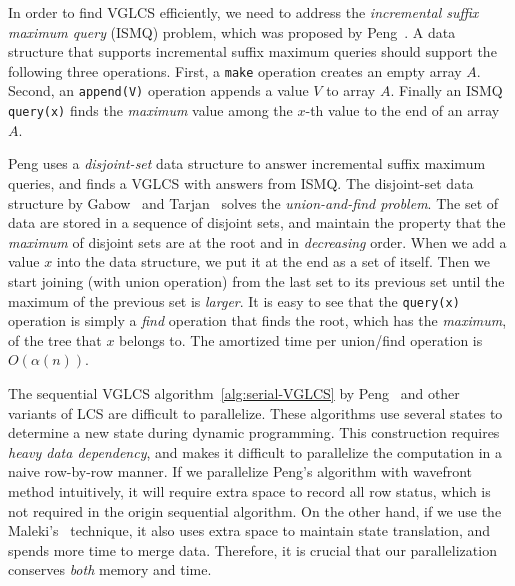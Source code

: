 In order to find VGLCS efficiently, we need to address the {\em
incremental suffix maximum query} (ISMQ) problem, which was proposed by
Peng~\cite{Peng2011TheLC}.  A data structure that supports incremental
suffix maximum queries should support the following three operations.
First, a {\tt make} operation creates an empty array $A$. Second, an
{\tt append(V)} operation appends a value $V$ to array $A$. Finally an
ISMQ {\tt query(x)} finds the {\em maximum} value among the $x$-th value
to the end of an array $A$.


Peng uses a {\em disjoint-set} data structure to answer incremental
suffix maximum queries, and finds a VGLCS with answers from ISMQ. The
disjoint-set data structure by Gabow~\cite{Gabow1983ALA} and
Tarjan~\cite{Tarjan1975EfficiencyOA} solves the {\em union-and-find
  problem}.  The set of data are stored in a sequence of disjoint
sets, and maintain the property that the {\em maximum} of disjoint
sets are at the root and in {\em decreasing} order.  When we add a
value $x$ into the data structure, we put it at the end as a set of
itself.  Then we start joining (with union operation) from the last
set to its previous set until the maximum of the previous set is {\em
  larger}.  It is easy to see that the {\tt query(x)} operation is
simply a {\em find} operation that finds the root, which has the {\em
  maximum}, of the tree that $x$ belongs to.  The amortized time per
union/find operation is $O(\alpha(n))$.


The sequential VGLCS algorithm~\ref{alg:serial-VGLCS} by
Peng~\cite{Peng2011TheLC} and other variants of LCS are difficult to
parallelize.  These algorithms use several states to determine a new
state during dynamic programming.  This construction requires {\em
  heavy data dependency}, and makes it difficult to parallelize the
computation in a naive row-by-row manner.  If we parallelize Peng's
algorithm with wavefront method intuitively, it will require extra
space to record all row status, which is not required in the origin
sequential algorithm.  On the other hand, if we use the
Maleki's~\cite{Maleki2016EfficientPU} technique, %
it also uses extra
space to maintain state translation, and spends more time to merge
data.  Therefore, it is crucial that our parallelization conserves
{\em both} memory and time.


